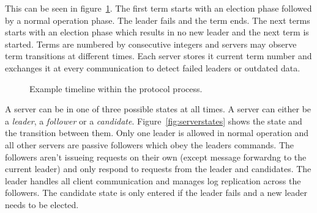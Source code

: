 This can be seen in figure~\ref{fig:terms}. The first term starts with an
election phase followed by a normal operation phase. The leader fails and
the term ends. The next terms starts with an election phase which results in no
new leader and the next term is started.
Terms are numbered by consecutive integers and servers may observe term
transitions at different times. Each server stores it current term number
and exchanges it at every communication to detect failed leaders or outdated
data.~\cite{ongaro2014search}

\begin{figure}[ht]
  \centering
  \caption{Example timeline within the protocol process.}
  \label{fig:terms}
\end{figure}

A server can be in one of three possible states at all times.
A server can either be a \textit{leader}, a \textit{follower} or a
\textit{candidate}. Figure~\ref{fig:serverstates} shows the state
and the transition between them. Only one leader is allowed in normal operation
and all other servers are passive followers which obey the leaders commands.
The followers aren't issueing requests on their own (except message forwardng to
the current leader) and only respond to requests from the leader and candidates.
The leader handles all client communication and manages log replication across
the followers. The candidate state is only entered if the leader fails and
a new leader needs to be elected.~\cite{ongaro2014search}


